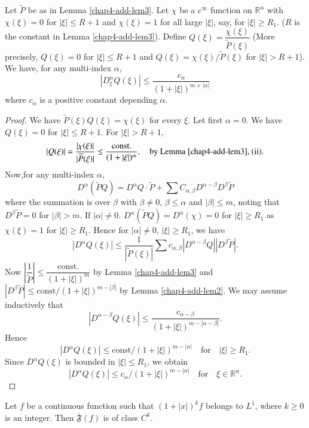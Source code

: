 \begin{lemma}\label{chap4-add-lem4}
Let $\widetilde{P}$ be as in Lemma \ref{chap4-add-lem3}. Let $\chi$ be a $c^{\infty}$ function on $\mathbb{R}^{n}$ with $\chi(\xi)=0$ for $|\xi|\leq R+1$ and $\chi(\xi)=1$ for all large $|\xi|$, say, for $|\xi|\geq R_{1}$. ($R$ is the constant in Lemma \ref{chap4-add-lem3}). Define $Q(\xi)=\dfrac{\chi(\xi)}{\widetilde{P}(\xi)}$ (More precisely, $Q(\xi)=0$ for $|\xi|\leq R+1$ and $Q(\xi)=\chi(\xi)/\widetilde{P}(\xi)$ for $|\xi|>R+1$). We have, for any multi-index $\alpha$,
$$
|D^{\alpha}_{\xi}Q(\xi)|\leq \dfrac{c_{\alpha}}{(1+|\xi|)^{m+|\alpha|}}
$$
where $c_{\alpha}$ is a positive constant depending $\alpha$.
\end{lemma}

\begin{proof}
We have $\widetilde{P}(\xi)Q(\xi)=\chi(\xi)$ for every $\xi$. Let first $\alpha=0$. We have $Q(\xi)=0$ for $|\xi|\leq R+1$. For $|\xi|>R+1$,
$$
|Q(\xi)|=\dfrac{|\chi(\xi)|}{|\widetilde{P}(\xi)|}\leq \dfrac{\text{const.}}{(1+|\xi|)^{m}},\quad \text{by Lemma \ref{chap4-add-lem3}, (ii)}.
$$
Now,\pageoriginale for any multi-index $\alpha$,
$$
D^{\alpha}(\widetilde{P}Q)=D^{\alpha}Q\cdot \widetilde{P}+\sum C_{\alpha,\beta}D^{\alpha-\beta}D^{\beta}\widetilde{P}
$$
where the summation is over $\beta$ with $\beta\neq 0$, $\beta\leq \alpha$ and $|\beta|\leq m$, noting that $D^{\beta}\widetilde{P}=0$ for $|\beta|>m$. If $|\alpha|\neq 0$. $D^{\alpha}(\widetilde{P}Q)=D^{\alpha}(\chi)=0$ for $|\xi|\geq R_{1}$ as $\chi(\xi)=1$ for $|\xi|\geq R_{1}$. Hence for $|\alpha|\neq 0$, $|\xi|\geq R_{1}$, we have
$$
|D^{\alpha}Q(\xi)|\leq \dfrac{1}{|\widetilde{P}(\xi)|}\sum c_{\alpha,\beta}|D^{\alpha-\beta}Q||D^{\beta}\widetilde{P}|.
$$
Now $\left|\dfrac{1}{\widetilde{P}}\right|\leq \dfrac{\text{const.}}{(1+|\xi|)^{m}}$ by Lemma \ref{chap4-add-lem3} and $|D^{\beta}\widetilde{P}|\leq \text{const}/(1+|\xi|)^{m-|\beta|}$ by Lemma \ref{chap4-add-lem2}. We may assume inductively that
$$
|D^{\alpha-\beta}Q(\xi)|\leq \dfrac{c_{\alpha-\beta}}{(1+|\xi|)^{m-|\alpha-\beta|}}.
$$
Hence
$$
|D^{\alpha}Q(\xi)|\leq \text{const}/(1+|\xi|)^{m-|\alpha|}\quad\text{for}\quad |\xi|\geq R_{1}.
$$
Since $D^{\alpha}Q(\xi)$ is bounded in $|\xi|\leq R_{1}$, we obtain
$$
|D^{\alpha}Q(\xi)|\leq c_{\alpha}/(1+|\xi|)^{m-|\alpha|}\quad\text{for}\quad \xi\in \mathbb{R}^{n}.
$$
\end{proof}

\begin{lemma}\label{chap4-add-lem5}
Let $f$ be a continuous function such that $(1+|x|)^{k}f$ belongs to $L^{1}$, where $k\geq 0$ is an integer. Then $\overline{\mathfrak{F}}(f)$ is of class $C^{k}$.
\end{lemma}


